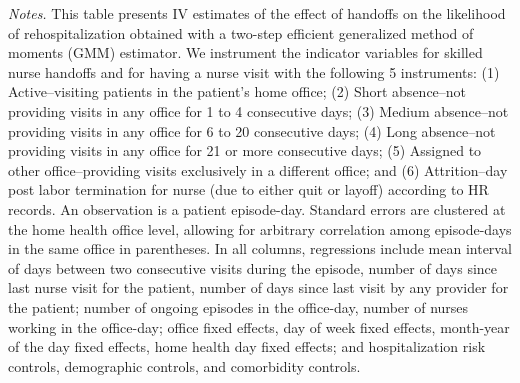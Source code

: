 \documentclass[final,12pt, notitlepage]{article}
\begin{document}
\begin{singlespace}
\begin{table}[H]
\begin{threeparttable}
{}
	\begin{tablenotes}
	\scriptsize
		\item \emph{Notes.} This table presents IV estimates of the effect of handoffs on the likelihood of rehospitalization obtained with a two-step efficient generalized method of moments (GMM) estimator.
	We instrument the indicator variables for skilled nurse handoffs and for having a nurse visit with the following 5 instruments:
(1) Active--visiting patients in the patient's home office;
(2) Short absence--not providing visits in any office for 1 to 4 consecutive days;
(3) Medium absence--not providing visits in any office for 6 to 20 consecutive days;
(4) Long absence--not providing visits in any office for 21 or more consecutive days;
(5) Assigned to other office--providing visits exclusively in a different office; and
(6) Attrition--day post labor termination for nurse (due to either quit or layoff) according to HR records.
	An observation is a patient episode-day.
	Standard errors are clustered at the home health office level, allowing for arbitrary correlation among episode-days in the same office in parentheses.
	In all columns, regressions include mean interval of days between two consecutive visits during the episode, number of days since last nurse visit for the patient, number of days since last visit by any provider for the patient; number of ongoing episodes in the office-day, number of nurses working in the office-day; office fixed effects, day of week fixed effects, month-year of the day fixed effects, home health day fixed effects; and hospitalization risk controls, demographic controls, and comorbidity controls.

\end{tablenotes}
\end{threeparttable}
\end{table}
\end{singlespace}
\end{document}
